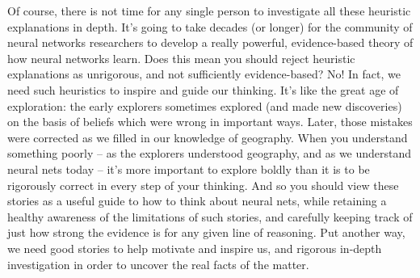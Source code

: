 \documentclass[a4paper,twoside,10pt]{book}
\begin{document}
Of course, there is not time for any single person to investigate all these heuristic explanations in depth. It's going to take decades (or longer) for the community of neural networks researchers to develop a really powerful, evidence-based theory of how neural networks learn. Does this mean you should reject heuristic explanations as unrigorous, and not sufficiently evidence-based? No! In fact, we need such heuristics to inspire and guide our thinking. It's like the great age of exploration: the early explorers sometimes explored (and made new discoveries) on the basis of beliefs which were wrong in important ways. Later, those mistakes were corrected as we filled in our knowledge of geography. When you understand something poorly -- as the explorers understood geography, and as we understand neural nets today -- it's more important to explore boldly than it is to be rigorously correct in every step of your thinking. And so you should view these stories as a useful guide to how to think about neural nets, while retaining a healthy awareness of the limitations of such stories, and carefully keeping track of just how strong the evidence is for any given line of reasoning. Put another way, we need good stories to help motivate and inspire us, and rigorous in-depth investigation in order to uncover the real facts of the matter.
\end{document}
